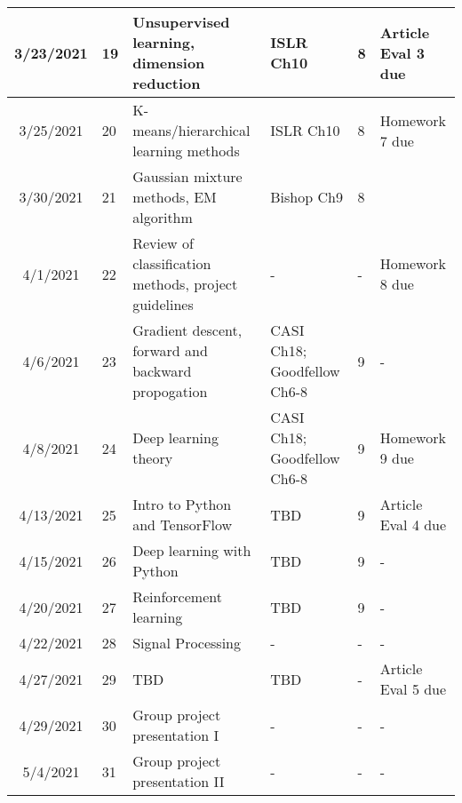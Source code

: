 \documentclass[11pt]{article}
\begin{document}
\begin{center}
\begin{tabular}{c|m{3em}|m{21em}|m{7em}|m{3em}|m{8em}}
3/23/2021 & 19 & Unsupervised learning, dimension reduction & ISLR Ch10 & 8 & Article Eval 3 due \\ \hline
3/25/2021 & 20 & K-means/hierarchical learning methods & ISLR Ch10 &  8 & Homework 7 due \\ \hline
3/30/2021 & 21 & Gaussian mixture methods, EM algorithm & Bishop Ch9 &  8 & \\ \hline
4/1/2021 & 22 & Review of classification methods, project guidelines & - & - & Homework 8 due \\ \hline
4/6/2021 & 23 & Gradient descent, forward and backward propogation & CASI Ch18; Goodfellow Ch6-8 &  9 & - \\ \hline
4/8/2021 & 24 & Deep learning theory & CASI Ch18; Goodfellow Ch6-8 & 9 & Homework 9 due\\ \hline
4/13/2021 & 25 & Intro to Python and TensorFlow & TBD & 9 &  Article Eval 4 due\\ \hline
4/15/2021 & 26 & Deep learning with Python & TBD & 9 & -\\ \hline
4/20/2021 & 27 & Reinforcement learning & TBD & 9 & -\\ \hline
4/22/2021 & 28 & Signal Processing & - & - & -\\ \hline
4/27/2021 & 29 & TBD & TBD & - & Article Eval 5 due\\ \hline
4/29/2021 & 30 & Group project presentation I & - & - & -\\ \hline
5/4/2021 & 31 & Group project presentation II & - & - & - 
\end{tabular}
\end{center}
\end{document}
